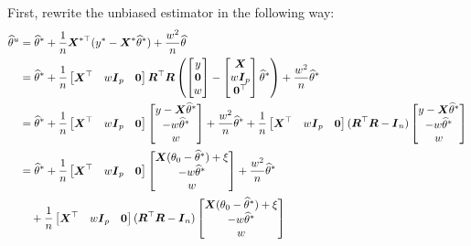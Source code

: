 \documentclass[11pt]{article}
\newcommand{\bX}{\boldsymbol{X}}
\newcommand{\bI}{\boldsymbol{I}}
\newcommand{\bR}{\boldsymbol{R}}
\newcommand{\hth}{\widehat{\theta}}
\begin{document}
    First, rewrite the unbiased estimator in the following way:
\small
\begin{align}\label{eq:decompo-Z}
    \hth^u &=  \hth^*+\frac{1}{n }\bX^{*\top}(y^*-\bX^*\hth^*)+\frac{w^2}{n }\hth\nonumber\\
        &= \hth^*+\frac{1}{n }\begin{bmatrix}\bX^\top & w\bI_p & \bf{0}\end{bmatrix} \bR^\top \bR \left(\begin{bmatrix}
            y\\
            \bf0\\
            w
        \end{bmatrix}-\begin{bmatrix}
            \bX\\
            w\bI_p\\
            \bf{0}^\top
        \end{bmatrix} \hth^*\right)+\frac{w^2}{n }\hth^*\nonumber\\
        &=  \hth^*+\frac{1}{n }\begin{bmatrix}\bX^\top & w\bI_p & \bf{0}\end{bmatrix} \begin{bmatrix}
            y-\bX\hth^*\\
            -w\hth^*\\
            w
        \end{bmatrix}+\frac{w^2}{n }\hth^*+\frac{1}{n }\begin{bmatrix}\bX^\top & w\bI_p & \bf{0}\end{bmatrix} (\bR^\top \bR-\bI_n)\begin{bmatrix}
            y-\bX\hth^*\\
            -w\hth^*\\
            w
        \end{bmatrix}\nonumber\\
        &=  \hth^*+\frac{1}{n }\begin{bmatrix}\bX^\top & w\bI_p & \bf{0}\end{bmatrix}\begin{bmatrix}\bX(\theta_0-\hth^*)+\xi\\ -w\hth^*\\ w\end{bmatrix}+\frac{w^2}{n }\hth^*\nonumber\\
        & \quad+\frac{1}{n }\begin{bmatrix}\bX^\top & w\bI_p & \bf{0}\end{bmatrix}(\bR^\top \bR-\bI_n)\begin{bmatrix}\bX(\theta_0-\hth^*)+\xi\\ -w\hth^*\\ w\end{bmatrix}\nonumber\\

\end{align}
\end{document}
